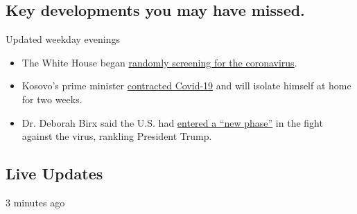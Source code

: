 \hypertarget{key-developments-you-may-have-missed}{%
\subsection{Key developments you may have
missed.}\label{key-developments-you-may-have-missed}}

Updated weekday evenings

\begin{itemize}
\tightlist
\item
  The White House began
  \href{https://www.nytimes.com/2020/08/03/world/coronavirus-covid-19.html\#link-c4a1d71}{randomly
  screening for the coronavirus}.
\item
  Kosovo's prime minister
  \href{https://nl.nytimes.com/f/a/umYjgHqFQS0DWGLnViksGQ~~/AAAAAQA~/RgRhCxH_P4QgAWh0dHBzOi8vd3d3LnJldXRlcnMuY29tL2FydGljbGUvdXMtaGVhbHRoLWNvcm9uYXZpcnVzLWtvc292by1wcmltZW1pbmlzdC9rb3Nvdm8tcHJpbWUtbWluaXN0ZXItc2F5cy1oZS1oYXMtY292aWQtMTktaWRVU0tCTjI0WTBPTj9jYW1wYWlnbl9pZD0xNTQmZW1jPWVkaXRfY2JfMjAyMDA4MDMmaW5zdGFuY2VfaWQ9MjA5NDQmbmw9Y29yb25hdmlydXMtYnJpZWZpbmcmcmVnaV9pZD0zNTQ2NDU0MSZzZWdtZW50X2lkPTM1MTI5JnRlPTEmdXNlcl9pZD02Njg0MjBkMWQ1MGVjZTM5ZTdlNGNkYmRkYzAxOTZkMFcDbnl0QgoAMv-MKF_UfRy_UhhrYXJlbi5iYXJyb3dAbnl0aW1lcy5jb21YBAAAAAA~}{contracted
  Covid-19} and will isolate himself at home for two weeks.
\item
  Dr. Deborah Birx said the U.S. had
  \href{https://www.nytimes.com/2020/08/03/world/coronavirus-covid-19.html}{entered
  a ``new phase''} in the fight against the virus, rankling President
  Trump.
\end{itemize}

\hypertarget{live-updates}{%
\subsection{Live Updates}\label{live-updates}}

3 minutes ago

